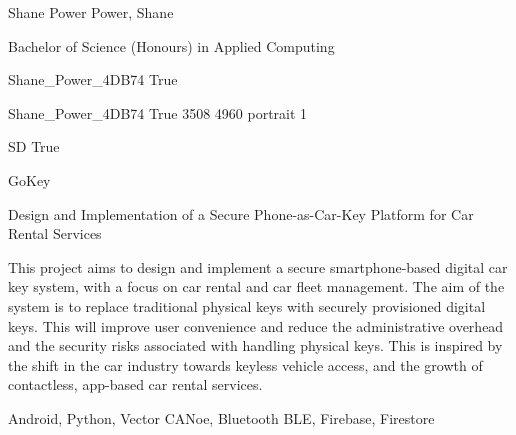 \documentclass[twoside]{report}
\begin{document}
\begingroup{}\relax



\def\Key{Shane_Power_4DB74}

{Shane Power}
{Power, Shane}

{Bachelor of Science (Honours) in Applied Computing}

{Shane_Power_4DB74}
{True}

{Shane_Power_4DB74}
{True}
{3508}
{4960}
{portrait}
{1}

{SD}
{True}

{GoKey}

{Design and Implementation of a Secure Phone-as-Car-Key Platform for Car Rental Services}

{This project aims to design and implement a secure smartphone-based digital car key system, with a focus on car rental and car fleet management. The aim of the system is to replace traditional physical keys with securely provisioned digital keys. This will improve user convenience and reduce the administrative overhead and the security risks associated with handling physical keys. This is inspired by the shift in the car industry towards keyless vehicle access, and the growth of contactless, app-based car rental services.}

{Android, Python, Vector CANoe, Bluetooth BLE, Firebase, Firestore}
\end{document}
